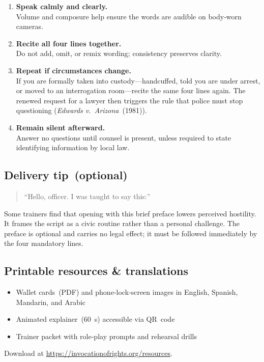 \begin{enumerate}[leftmargin=*,label=\textbf{\arabic*.}]
\item \textbf{Speak calmly and clearly.}\\
      Volume and composure help ensure the words are audible on body‑worn cameras.

\item \textbf{Recite all four lines together.}\\
      Do not add, omit, or remix wording; consistency preserves clarity.

\item \textbf{Repeat if circumstances change.}\\
      If you are formally taken into custody—handcuffed, told you are under arrest, or moved to an interrogation room—recite the same four lines again.  
      The renewed request for a lawyer then triggers the rule that police must stop questioning (\textit{Edwards v.\ Arizona} (1981)).

\item \textbf{Remain silent afterward.}\\
      Answer no questions until counsel is present, unless required to state identifying information by local law.
\end{enumerate}

\subsection*{Delivery tip (optional)}
\begin{quote}
``Hello, officer. I was taught to say this:''
\end{quote}
Some trainers find that opening with this brief preface lowers perceived hostility. It frames the script as a civic routine rather than a personal challenge. The preface is optional and carries no legal effect; it must be followed immediately by the four mandatory lines.

\subsection*{Printable resources \& translations}

\begin{itemize}[leftmargin=*]
\item Wallet cards (PDF) and phone‑lock‑screen images in English, Spanish, Mandarin, and Arabic
\item Animated explainer (60 s) accessible via QR code
\item Trainer packet with role‑play prompts and rehearsal drills
\end{itemize}

Download at \url{https://invocationofrights.org/resources}.
